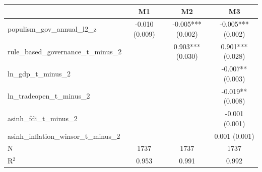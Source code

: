 \begin{tabular}{lccc}
\toprule
 & M1 & M2 & M3 \\
\midrule
populism_gov_annual_l2_z & -0.010 (0.009) & -0.005*** (0.002) & -0.005*** (0.002) \\
rule_based_governance_t_minus_2 &  & 0.903*** (0.030) & 0.901*** (0.028) \\
ln_gdp_t_minus_2 &  &  & -0.007** (0.003) \\
ln_tradeopen_t_minus_2 &  &  & -0.019** (0.008) \\
asinh_fdi_t_minus_2 &  &  & -0.001 (0.001) \\
asinh_inflation_winsor_t_minus_2 &  &  & 0.001 (0.001) \\
N & 1737 & 1737 & 1737 \\
R$^2$ & 0.953 & 0.991 & 0.992 \\
\bottomrule
\end{tabular}
